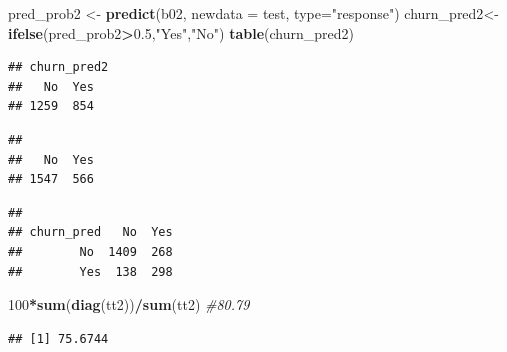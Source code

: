 \documentclass[
  twoside]{article}
\newenvironment{Shaded}{\begin{snugshade}}{\end{snugshade}}
\newcommand{\AttributeTok}[1]{\textcolor[rgb]{0.13,0.29,0.53}{#1}}
\newcommand{\CommentTok}[1]{\textcolor[rgb]{0.56,0.35,0.01}{\textit{#1}}}
\newcommand{\DecValTok}[1]{\textcolor[rgb]{0.00,0.00,0.81}{#1}}
\newcommand{\FloatTok}[1]{\textcolor[rgb]{0.00,0.00,0.81}{#1}}
\newcommand{\FunctionTok}[1]{\textcolor[rgb]{0.13,0.29,0.53}{\textbf{#1}}}
\newcommand{\NormalTok}[1]{#1}
\newcommand{\OtherTok}[1]{\textcolor[rgb]{0.56,0.35,0.01}{#1}}
\newcommand{\SpecialCharTok}[1]{\textcolor[rgb]{0.81,0.36,0.00}{\textbf{#1}}}
\newcommand{\StringTok}[1]{\textcolor[rgb]{0.31,0.60,0.02}{#1}}
\begin{document}
\begin{Shaded}
\begin{Highlighting}[]
\NormalTok{pred\_prob2 }\OtherTok{\textless{}{-}} \FunctionTok{predict}\NormalTok{(b02, }\AttributeTok{newdata =}\NormalTok{ test, }\AttributeTok{type=}\StringTok{"response"}\NormalTok{)}
\NormalTok{churn\_pred2}\OtherTok{\textless{}{-}} \FunctionTok{ifelse}\NormalTok{(pred\_prob2}\SpecialCharTok{\textgreater{}}\FloatTok{0.5}\NormalTok{,}\StringTok{"Yes"}\NormalTok{,}\StringTok{"No"}\NormalTok{)}
\FunctionTok{table}\NormalTok{(churn\_pred2)}
\end{Highlighting}
\end{Shaded}

\begin{verbatim}
## churn_pred2
##   No  Yes 
## 1259  854
\end{verbatim}

\begin{Shaded}
\end{Shaded}

\begin{verbatim}
## 
##   No  Yes 
## 1547  566
\end{verbatim}

\begin{Shaded}
\end{Shaded}

\begin{verbatim}
##           
## churn_pred   No  Yes
##        No  1409  268
##        Yes  138  298
\end{verbatim}

\begin{Shaded}
\begin{Highlighting}[]
\DecValTok{100}\SpecialCharTok{*}\FunctionTok{sum}\NormalTok{(}\FunctionTok{diag}\NormalTok{(tt2))}\SpecialCharTok{/}\FunctionTok{sum}\NormalTok{(tt2) }\CommentTok{\#80.79}
\end{Highlighting}
\end{Shaded}

\begin{verbatim}
## [1] 75.6744
\end{verbatim}
\end{document}
